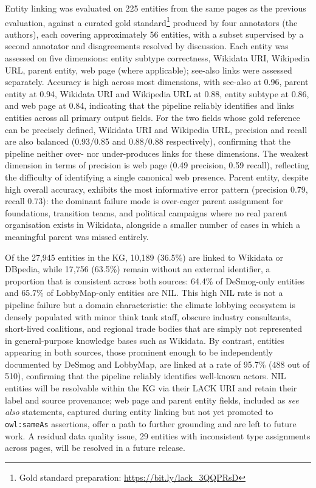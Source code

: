 Entity linking was evaluated on 225 entities from the same pages as the previous evaluation, against a curated gold standard\footnote{Gold standard preparation: \url{https://bit.ly/lack_3QQPRsD}} produced by four annotators (the authors), each covering approximately 56 entities, with a subset supervised by a second annotator and disagreements resolved by discussion.
Each entity was assessed on five dimensions: entity subtype correctness, Wikidata URI, Wikipedia URL, parent entity, web page (where applicable); see-also links were assessed separately.
Accuracy is high across most dimensions, with see-also at 0.96, parent entity at 0.94, Wikidata URI and Wikipedia URL at 0.88, entity subtype at 0.86, and web page at 0.84, indicating that the pipeline reliably identifies and links entities across all primary output fields.
For the two fields whose gold reference can be precisely defined, Wikidata URI and Wikipedia URL, precision and recall are also balanced (0.93/0.85 and 0.88/0.88 respectively), confirming that the pipeline neither over- nor under-produces links for these dimensions.
The weakest dimension in terms of precision is web page (0.49 precision, 0.59 recall), reflecting the difficulty of identifying a single canonical web presence.
Parent entity, despite high overall accuracy, exhibits the most informative error pattern (precision 0.79, recall 0.73): the dominant failure mode is over-eager parent assignment for foundations, transition teams, and political campaigns where no real parent organisation exists in Wikidata, alongside a smaller number of cases in which a meaningful parent was missed entirely.

Of the 27,945 entities in the KG, 10,189 (36.5\%) are linked to Wikidata or DBpedia, while 17,756 (63.5\%) remain without an external identifier, a proportion that is consistent across both sources: 64.4\% of DeSmog-only entities and 65.7\% of LobbyMap-only entities are NIL.
This high NIL rate is not a pipeline failure but a domain characteristic: the climate lobbying ecosystem is densely populated with minor think tank staff, obscure industry consultants, short-lived coalitions, and regional trade bodies that are simply not represented in general-purpose knowledge bases such as Wikidata.
By contrast, entities appearing in both sources, those prominent enough to be independently documented by DeSmog and LobbyMap, are linked at a rate of 95.7\% (488 out of 510), confirming that the pipeline reliably identifies well-known actors.
NIL entities will be resolvable within the KG via their LACK URI and retain their label and source provenance; web page and parent entity fields, included as \textit{see also} statements, captured during entity linking but not yet promoted to \texttt{owl:sameAs} assertions, offer a path to further grounding and are left to future work.
A residual data quality issue, 29 entities with inconsistent type assignments across pages, will be resolved in a future release.

